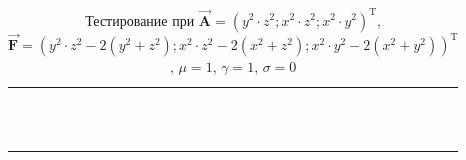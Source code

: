 \begin{table}
	\caption{Тестирование при $\overrightarrow{\textbf{A}} = (y^2 \cdot z^2; x^2 \cdot z^2; x^2 \cdot y^2)^{\text{T}}$, $\overrightarrow{\textbf{F}} = (y^2 \cdot z^2 - 2(y^2 + z^2); x^2 \cdot z^2 - 2(x^2 + z^2); x^2 \cdot y^2 - 2(x^2 + y^2))^{\text{T}}$, $\mu = 1$, $\gamma = 1$, $\sigma = 0$}
	\centering
	\small
	\begin{tabularx}{1.0\textwidth}{| >{\raggedright\arraybackslash}X | >{\raggedright\arraybackslash}X | >{\raggedright\arraybackslash}X |>{\raggedright\arraybackslash}X |}
		\hline
		\centering{Ребро} & \centering{Значение} & \centering{Абсолютная погрешность} & \centering{Относительная погрешность} \tabularnewline \hline
		
		
		\centering{($x; 1.0; 1.0$)} & \centering{1.00000000E+000}& \centering{0.00000000E+000} & \centering{0.00000000E+000} \tabularnewline \hline
		
		\centering{($x; 2.0; 1.0$)} & \centering{4.00000000E+000}& \centering{0.00000000E+000} & \centering{0.00000000E+000} \tabularnewline \hline
		
		\centering{($x; 1.0; 2.0$)} & \centering{4.00000000E+000}& \centering{0.00000000E+000} & \centering{0.00000000E+000} \tabularnewline \hline
		
		\centering{($x; 2.0; 2.0$)} & \centering{1.60000000E+001}& \centering{0.00000000E+000} & \centering{0.00000000E+000} \tabularnewline \hline
		
		
		
		\centering{($1.0; y; 1.0$)} & \centering{1.00000000E+000}& \centering{0.00000000E+000} & \centering{0.00000000E+000} \tabularnewline \hline
		
		\centering{($2.0; y; 1.0$)} & \centering{4.00000000E+000}& \centering{0.00000000E+000} & \centering{0.00000000E+000} \tabularnewline \hline
		
		\centering{($1.0; y; 2.0$)} & \centering{4.00000000E+000}& \centering{0.00000000E+000} & \centering{0.00000000E+000} \tabularnewline \hline
		
		\centering{($2.0; y; 2.0$)} & \centering{1.60000000E+001}& \centering{0.00000000E+000} & \centering{0.00000000E+000} \tabularnewline \hline
		
		
		
		\centering{($1.0; 1.0; z$)} & \centering{1.00000000E+000}& \centering{0.00000000E+000} & \centering{0.00000000E+000} \tabularnewline \hline
		
		\centering{($2.0; 1.0; z$)} & \centering{4.00000000E+000}& \centering{0.00000000E+000} & \centering{0.00000000E+000} \tabularnewline \hline
		
		\centering{($1.0; 2.0; z$)} & \centering{4.00000000E+000}& \centering{0.00000000E+000} & \centering{0.00000000E+000} \tabularnewline \hline
		
		\centering{($2.0; 2.0; z$)} & \centering{1.60000000E+001}& \centering{0.00000000E+000} & \centering{0.00000000E+000} \tabularnewline \hline
		
	\end{tabularx}
	\label{tab:test9}
\end{table}


